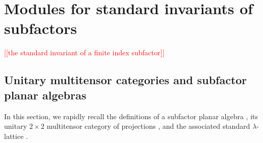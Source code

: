 \documentclass[11pt]{article}
\theoremstyle{plain}
\theoremstyle{definition}
\newcommand{\nn}[1]{\textcolor{red}{[[#1]]}}
\begin{document}
\section{Modules for standard invariants of subfactors} 
\label{sec:Modules}

\nn{the standard invariant of a finite index subfactor}

\subsection{Unitary multitensor categories and subfactor planar algebras}  
\label{sec:CategoriesPlanarAlgberasLattices}

In this section, we rapidly recall the definitions of a subfactor planar algebra \cite{math.QA/9909027}, its unitary $2\times 2$ multitensor category of projections \cite{MR2811311,1808.00323}, and the associated standard $\lambda$-lattice \cite{MR1334479}.
\end{document}
